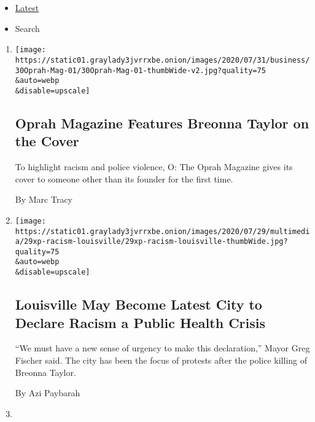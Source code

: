 \begin{itemize}
\tightlist
\item
  \protect\hyperlink{stream-panel}{Latest}
\item
  Search
\end{itemize}

\begin{enumerate}
\def\labelenumi{\arabic{enumi}.}
\item
  \href{/2020/07/30/business/media/oprah-magazine-breonna-taylor-cover.html}{}

  \texttt{[image: https://static01.graylady3jvrrxbe.onion/images/2020/07/31/business/30Oprah-Mag-01/30Oprah-Mag-01-thumbWide-v2.jpg?quality=75\\\&auto=webp\\\&disable=upscale]}

  \hypertarget{oprah-magazine-features-breonna-taylor-on-the-cover}{%
  \subsection{Oprah Magazine Features Breonna Taylor on the
  Cover}\label{oprah-magazine-features-breonna-taylor-on-the-cover}}

  To highlight racism and police violence, O: The Oprah Magazine gives
  its cover to someone other than its founder for the first time.

  By Marc Tracy
\item
  \href{/2020/07/30/us/louisville-racism-crisis.html}{}

  \texttt{[image: https://static01.graylady3jvrrxbe.onion/images/2020/07/29/multimedia/29xp-racism-louisville/29xp-racism-louisville-thumbWide.jpg?quality=75\\\&auto=webp\\\&disable=upscale]}

  \hypertarget{louisville-may-become-latest-city-to-declare-racism-a-public-health-crisis}{%
  \subsection{Louisville May Become Latest City to Declare Racism a
  Public Health
  Crisis}\label{louisville-may-become-latest-city-to-declare-racism-a-public-health-crisis}}

  ``We must have a new sense of urgency to make this declaration,''
  Mayor Greg Fischer said. The city has been the focus of protests after
  the police killing of Breonna Taylor.

  By Azi Paybarah
\item
  \href{/2020/07/29/us/wisconsin-tim-carpenter-attacked.html}{}


\end{enumerate}
